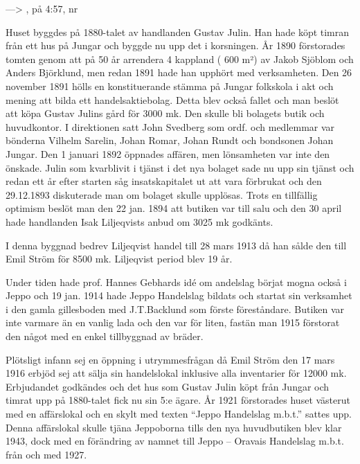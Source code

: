 ---> , på 4:57, nr 


Huset byggdes på 1880-talet av handlanden Gustav Julin. Han hade köpt timran från ett hus på Jungar och byggde nu upp det i korsningen. År 1890 förstorades tomten genom att på 50 år arrendera 4 kappland ( 600 m²) av Jakob Sjöblom och Anders Björklund, men redan 1891 hade han upphört med verksamheten. Den 26 november 1891 hölls en konstituerande stämma på Jungar folkskola i akt och mening att bilda ett handelsaktiebolag. Detta blev också fallet och man beslöt att köpa Gustav Julins gård för 3000 mk. Den skulle bli bolagets  butik  och huvudkontor. I direktionen satt John Svedberg som ordf. och medlemmar var bönderna Vilhelm Sarelin, Johan Romar, Johan Rundt och bondsonen Johan Jungar. Den 1 januari 1892 öppnades affären, men lönsamheten var inte den önskade. Julin som kvarblivit i tjänst i det nya bolaget sade nu upp sin tjänst och redan ett år efter starten såg insatskapitalet ut att vara förbrukat och den 29.12.1893 diskuterade man om bolaget skulle upplösas. Trots en tillfällig optimism beslöt man den 22 jan. 1894 att butiken var till salu och den 30 april hade handlanden Isak Liljeqvists anbud om 3025 mk godkänts.


I denna byggnad bedrev Liljeqvist handel till 28 mars 1913 då han sålde den till Emil Ström för 8500 mk. Liljeqvist period blev 19 år.

Under tiden hade prof. Hannes Gebhards idé om andelslag börjat mogna också i Jeppo och 19 jan. 1914 hade Jeppo Handelslag bildats och startat sin verksamhet i den gamla gillesboden med J.T.Backlund som förste föreståndare. Butiken var inte varmare än en vanlig lada och den var för liten, fastän man 1915 förstorat den något med en enkel tillbyggnad av bräder.

Plötsligt infann sej en öppning i utrymmesfrågan då Emil Ström den 17 mars 1916 erbjöd sej att sälja sin handelslokal inklusive alla inventarier för 12000 mk. Erbjudandet godkändes och det hus som Gustav Julin köpt från Jungar och timrat upp på 1880-talet fick nu sin 5:e ägare. År 1921 förstorades huset västerut med en affärslokal och en skylt med texten ``Jeppo Handelslag m.b.t.'' sattes upp. Denna affärslokal skulle tjäna Jeppoborna tills den nya huvudbutiken blev klar 1943, dock med en förändring av namnet till Jeppo – Oravais Handelslag m.b.t. från och med  1927.

